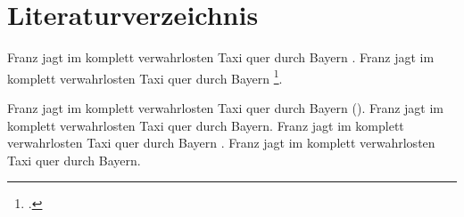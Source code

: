\documentclass[10pt]{article}
\begin{document}
\tableofcontents
\section{Literaturverzeichnis}
Franz jagt im komplett verwahrlosten Taxi quer durch Bayern \parencite[siehe][S. 12-14]{lkgt}. Franz jagt im komplett verwahrlosten Taxi quer durch Bayern \footcite[siehe][Kapitel 3. Seite 455]{bworld}.

 Franz jagt im komplett verwahrlosten Taxi quer durch Bayern (\cite{dlb}).  Franz jagt im komplett verwahrlosten Taxi quer durch Bayern.  Franz jagt im komplett verwahrlosten Taxi quer durch Bayern \parencite{article1}. Franz jagt im komplett verwahrlosten Taxi quer durch Bayern.


\printbibliography
\end{document}
